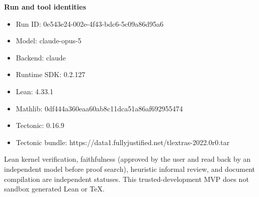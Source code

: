\documentclass[11pt]{article}
\begin{document}
\begin{samepage}
\textbf{Run and tool identities}
\begin{itemize}
\item Run ID: 0e543e24-002e-4f43-bdc6-5c09a86d95a6
\item Model: claude-opus-5
\item Backend: claude
\item Runtime SDK: 0.2.127
\item Lean: 4.33.1
\item Mathlib: 0df444a360eaa60ab8c11dca51a86af692955474
\item Tectonic: 0.16.9
\item Tectonic bundle: https://data1.fullyjustified.net/tlextras-2022.0r0.tar
\end{itemize}
\end{samepage}

\vfill
\small
Lean kernel verification, faithfulness (approved by the user and read back by an
independent model before proof search), heuristic informal review, and document
compilation are independent statuses. This trusted-development MVP
does not sandbox generated Lean or TeX.
\end{document}
